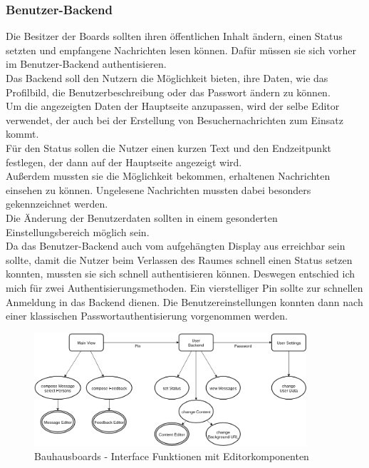 \subsubsection{Benutzer-Backend}\label{Benutzer-Backend}
Die Besitzer der Boards sollten ihren öffentlichen Inhalt ändern, einen Status setzten und empfangene Nachrichten lesen können.
Dafür müssen sie sich vorher im Benutzer-Backend authentisieren.
\\
Das Backend soll den Nutzern die Möglichkeit bieten, ihre Daten, wie das Profilbild, die Benutzerbeschreibung oder das Passwort ändern zu können.
\\
Um die angezeigten Daten der Hauptseite anzupassen, wird der selbe Editor verwendet, der auch bei der Erstellung von Besuchernachrichten zum Einsatz kommt.
\\
Für den Status sollen die Nutzer einen kurzen Text und den Endzeitpunkt festlegen, der dann auf der Hauptseite angezeigt wird.
\\
Außerdem mussten sie die Möglichkeit bekommen, erhaltenen Nachrichten einsehen zu können. Ungelesene Nachrichten mussten dabei besonders gekennzeichnet werden.\\
Die Änderung der Benutzerdaten sollten in einem gesonderten Einstellungsbereich möglich sein.
\\
Da das Benutzer-Backend auch vom aufgehängten Display aus erreichbar sein sollte, damit die Nutzer beim Verlassen des Raumes schnell einen Status setzen konnten, mussten sie sich schnell authentisieren können.
Deswegen entschied ich mich für zwei Authentisierungsmethoden.
Ein vierstelliger Pin sollte zur schnellen Anmeldung in das Backend dienen.
Die Benutzereinstellungen konnten dann nach einer klassischen Passwortauthentisierung vorgenommen werden.
\begin{figure}[h!]
  \centering
    \includegraphics[width=0.9\textwidth]{./img/LocationsFrontend.png}
  \caption{Bauhausboards - Interface Funktionen mit Editorkomponenten}
  \label{img:Interface}
\end{figure}

